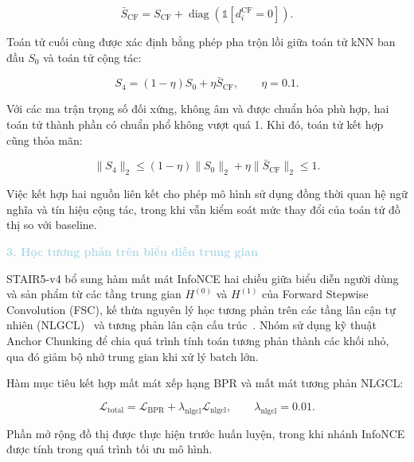 \begin{equation}
\bar{S}_{\mathrm{CF}}
=
S_{\mathrm{CF}}
+
\operatorname{diag}
\left(
\mathbb{1}[d_i^{\mathrm{CF}}=0]
\right).
\end{equation}

Toán tử cuối cùng được xác định bằng phép pha trộn lồi giữa toán tử kNN ban đầu $S_0$ và toán tử cộng tác:

\begin{equation}
S_4=(1-\eta)S_0+\eta\bar{S}_{\mathrm{CF}},
\qquad \eta=0.1.
\end{equation}

Với các ma trận trọng số đối xứng, không âm và được chuẩn hóa phù hợp, hai toán tử thành phần có chuẩn phổ không vượt quá 1. Khi đó, toán tử kết hợp cũng thỏa mãn:

\begin{equation}
\lVert S_4\rVert_2
\leq
(1-\eta)\lVert S_0\rVert_2
+
\eta\lVert\bar{S}_{\mathrm{CF}}\rVert_2
\leq 1.
\end{equation}

Việc kết hợp hai nguồn liên kết cho phép mô hình sử dụng đồng thời quan hệ ngữ nghĩa và tín hiệu cộng tác, trong khi vẫn kiểm soát mức thay đổi của toán tử đồ thị so với baseline.

\noindent\textcolor{lightblue}{\textbf{3. Học tương phản trên biểu diễn trung gian}}

STAIR5-v4 bổ sung hàm mất mát InfoNCE hai chiều giữa biểu diễn người dùng và sản phẩm từ các tầng trung gian $H^{(0)}$ và $H^{(1)}$ của Forward Stepwise Convolution (FSC), kế thừa nguyên lý học tương phản trên các tầng lân cận tự nhiên (NLGCL)~\cite{xu2024nlgcl} và tương phản lân cận cấu trúc~\cite{lin2022ncl}. Nhóm sử dụng kỹ thuật Anchor Chunking để chia quá trình tính toán tương phản thành các khối nhỏ, qua đó giảm bộ nhớ trung gian khi xử lý batch lớn.

Hàm mục tiêu kết hợp mất mát xếp hạng BPR và mất mát tương phản NLGCL:

\begin{equation}
\mathcal{L}_{\mathrm{total}}
=
\mathcal{L}_{\mathrm{BPR}}
+
\lambda_{\mathrm{nlgcl}}\mathcal{L}_{\mathrm{nlgcl}},
\qquad
\lambda_{\mathrm{nlgcl}}=0.01.
\end{equation}

Phần mở rộng đồ thị được thực hiện trước huấn luyện, trong khi nhánh InfoNCE được tính trong quá trình tối ưu mô hình.


